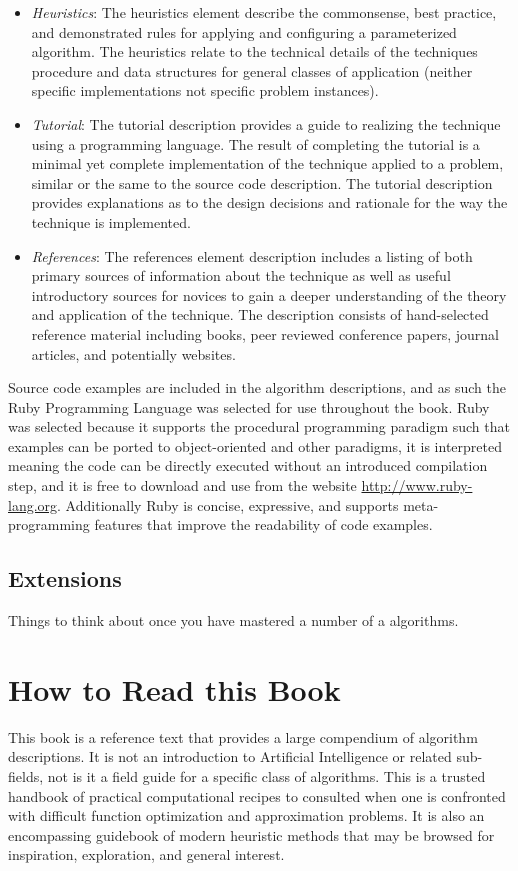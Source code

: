 \begin{itemize}
	\item \emph{Heuristics}: The heuristics element describe the commonsense, best practice, and demonstrated rules for applying and configuring a parameterized algorithm. The heuristics relate to the technical details of the techniques procedure and data structures for general classes of application (neither specific implementations not specific problem instances).
	\item \emph{Tutorial}: The tutorial description provides a guide to realizing the technique using a programming language. The result of completing the tutorial is a minimal yet complete implementation of the technique applied to a problem, similar or the same to the source code description. The tutorial description provides explanations as to the design decisions and rationale for the way the technique is implemented.
	\item \emph{References}: The references element description includes a listing of both primary sources of information about the technique as well as useful introductory sources for novices to gain a deeper understanding of the theory and application of the technique. The description consists of hand-selected reference material including books, peer reviewed conference papers, journal articles, and potentially websites.
\end{itemize}

Source code examples are included in the algorithm descriptions, and as such the Ruby Programming Language was selected for use throughout the book. Ruby was selected because it supports the procedural programming paradigm such that examples can be ported to object-oriented and other paradigms, it is interpreted meaning the code can be directly executed without an introduced compilation step, and it is free to download and use from the website \url{http://www.ruby-lang.org}. Additionally Ruby is concise, expressive, and supports meta-programming features that improve the readability of code examples.

% 
%
\subsection{Extensions}
Things to think about once you have mastered a number of a algorithms.



% 
% 
\section{How to Read this Book}
\label{intro:sec:how_to_read}
This book is a reference text that provides a large compendium of algorithm descriptions. It is not an introduction to Artificial Intelligence or related sub-fields, not is it a field guide for a specific class of algorithms. 
This is a trusted handbook of practical computational recipes to consulted when one is confronted with difficult function optimization and approximation problems. It is also an encompassing guidebook of modern heuristic methods that may be browsed for inspiration, exploration, and general interest.

